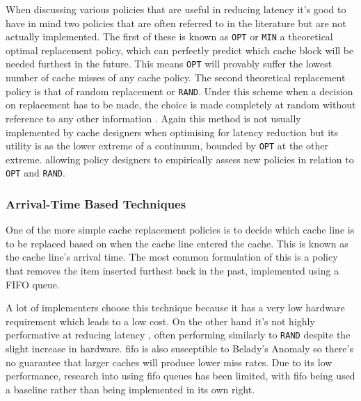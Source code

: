 When discussing various policies that are useful in reducing latency it's good to have in mind two policies that are often referred to in the literature but are not actually implemented. The first of these is known as \texttt{OPT} or \texttt{MIN} \cite{jeongOptimalReplacementsCaches1999} a theoretical optimal replacement policy, which can perfectly predict which cache block will be needed furthest in the future. This means \texttt{OPT} will provably suffer the lowest number of cache misses of any cache policy. The second theoretical replacement policy is that of random replacement or \texttt{RAND}. Under this scheme when a decision on replacement has to be made, the choice is made completely at random without reference to any other information \cite{beladyStudyReplacementAlgorithms1966}. Again this method is not usually implemented by cache designers when optimising for latency reduction \cite{karedlaCachingStrategiesImprove1994} but its utility is as the lower extreme of a continuum, bounded by \texttt{OPT} at the other extreme. allowing policy designers to empirically assess new policies in relation to \texttt{OPT} and \texttt{RAND}.


\subsubsection{Arrival-Time Based Techniques}

One of the more simple cache replacement policies is to decide which cache line is to be replaced based on when the cache line entered the cache. This is known as the cache line's arrival time. The most common formulation of this is a policy that removes the item inserted furthest back in the past, implemented using a FIFO queue.

A lot of implementers choose this technique because it has a very low hardware requirement \cite{pandaSurveyReplacementStrategies2016} which leads to a low cost. On the other hand it's not highly performative at reducing latency \cite{al-zoubiPerformanceEvaluationCache2004, tsaoMultiFactorPagingExperiment1972}, often performing similarly to \texttt{RAND} despite the slight increase in hardware. \gls{fifo} is also susceptible to Belady's Anomaly \cite{beladyAnomalySpacetimeCharacteristics1969} so there's no guarantee that larger caches will produce lower miss rates. Due to its low performance, research into using \gls{fifo} queues has been limited, with \gls{fifo} being used a baseline \cite{faresPerformanceEvaluationTraditional2012} rather than being implemented in its own right.

